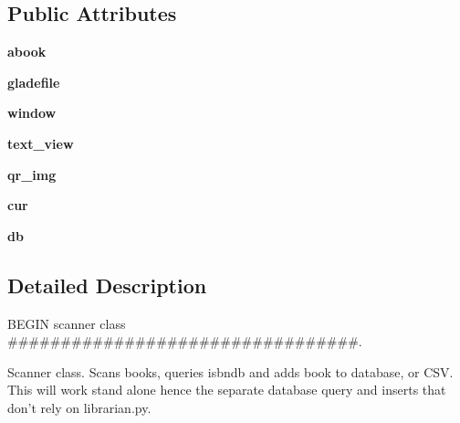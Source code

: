 \subsection*{Public Attributes}
\begin{DoxyCompactItemize}
\item 
\hypertarget{classsrc_1_1guiscan_1_1scanner_a7bf15a8e9812faee9b163bbc8e9f4cf5}{
{\bfseries abook}}
\label{classsrc_1_1guiscan_1_1scanner_a7bf15a8e9812faee9b163bbc8e9f4cf5}

\item 
\hypertarget{classsrc_1_1guiscan_1_1scanner_a27cb7eaf7b8af16f81ce70d42fc7d9e7}{
{\bfseries gladefile}}
\label{classsrc_1_1guiscan_1_1scanner_a27cb7eaf7b8af16f81ce70d42fc7d9e7}

\item 
\hypertarget{classsrc_1_1guiscan_1_1scanner_aa96f6b887ccb4f83a8ab081cbaf4b9bc}{
{\bfseries window}}
\label{classsrc_1_1guiscan_1_1scanner_aa96f6b887ccb4f83a8ab081cbaf4b9bc}

\item 
\hypertarget{classsrc_1_1guiscan_1_1scanner_a6e5b0b40019cc45d6ecb8afe78895796}{
{\bfseries text\_\-view}}
\label{classsrc_1_1guiscan_1_1scanner_a6e5b0b40019cc45d6ecb8afe78895796}

\item 
\hypertarget{classsrc_1_1guiscan_1_1scanner_aa893dc7cec6aa02379479f854ea9fae1}{
{\bfseries qr\_\-img}}
\label{classsrc_1_1guiscan_1_1scanner_aa893dc7cec6aa02379479f854ea9fae1}

\item 
\hypertarget{classsrc_1_1guiscan_1_1scanner_a3a972ddcb421075a1280bf2143e3d9fb}{
{\bfseries cur}}
\label{classsrc_1_1guiscan_1_1scanner_a3a972ddcb421075a1280bf2143e3d9fb}

\item 
\hypertarget{classsrc_1_1guiscan_1_1scanner_a7157289ec79a1c5c5f90b1146119be38}{
{\bfseries db}}
\label{classsrc_1_1guiscan_1_1scanner_a7157289ec79a1c5c5f90b1146119be38}

\end{DoxyCompactItemize}


\subsection{Detailed Description}
BEGIN scanner class \#\#\#\#\#\#\#\#\#\#\#\#\#\#\#\#\#\#\#\#\#\#\#\#\#\#\#\#\#\#\#\#\#. 

\begin{DoxyVerb}Scanner class. Scans books, queries isbndb and adds book to database,
or CSV.  This will work stand alone hence the separate database query
and inserts that don't rely on librarian.py.

\end{DoxyVerb}
 

